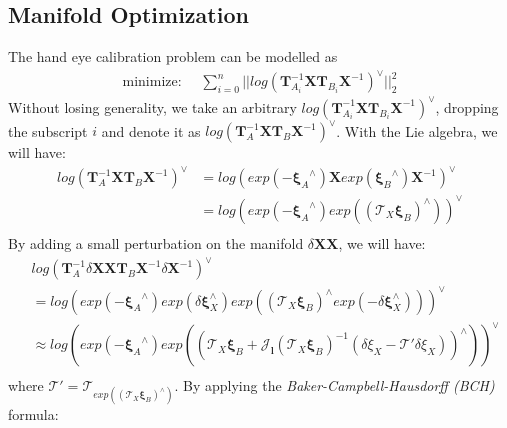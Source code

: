 \subsection{Manifold Optimization}
The hand eye calibration problem can be modelled as
\begin{align}
\text{minimize: }& \ \sum_{i=0}^{n} ||log\left( \mathbf{T}_{A_i}^{-1}\mathbf{X}\mathbf{T}_{B_i}\mathbf{X}^{-1} \right)^{\vee}||_2^2 
\end{align}
Without losing generality, we take an arbitrary $log\left( \mathbf{T}_{A_i}^{-1}\mathbf{X}\mathbf{T}_{B_i}\mathbf{X}^{-1} \right)^{\vee}$, dropping the subscript $i$ and denote it as $log\left( \mathbf{T}_{A}^{-1}\mathbf{X}\mathbf{T}_{B}\mathbf{X}^{-1} \right)^{\vee}$. With the Lie algebra, we will have:
\begin{align}
log\left( \mathbf{T}_{A}^{-1}\mathbf{X}\mathbf{T}_{B}\mathbf{X}^{-1} \right)^{\vee}&=
log\left( exp(-{\mathbf{\xi}_A}^{\wedge})\mathbf{X}exp({\mathbf{\xi}_B}^{\wedge})\mathbf{X}^{-1} \right)^{\vee} \\
&= log\left( exp\left(-{\mathbf{\xi}_A}^{\wedge}\right) exp\left(\left(\mathbf{\mathcal{T}}_X{\mathbf{\xi}_B}\right)^{\wedge}\right) \right)^{\vee} \\
\end{align}
By adding a small perturbation on the manifold $\delta \mathbf{X}\mathbf{X}$, we will have:
\begin{align}
&log \left( \mathbf{T}_{A}^{-1}{\delta\mathbf{X}}\mathbf{X}\mathbf{T}_{B}\mathbf{X}^{-1}{\delta\mathbf{X}^{-1}} \right)^{\vee} \\
&= log\left( exp\left(-{\mathbf{\xi}_A}^{\wedge}\right) {exp(\delta \mathbf{\xi}_{X}^{\wedge})} exp\left(\left(\mathcal{T}_X{\mathbf{\xi}_B}\right)^{\wedge} {exp(-\delta \mathbf{\xi}_{X}^{\wedge})}\right) \right)^{\vee}\\
&\approx log\left( exp\left(-{\mathbf{\xi}_A}^{\wedge}\right) exp
\left(
\left( 
\mathcal{T}_X{\mathbf{\xi}_B} + \mathbf{\mathcal{J}_{l}}
\left(
\mathcal{T}_X{\mathbf{\xi}_B}
\right) ^{-1} 
\left( 
\delta \xi_{X} - \mathbf{\mathcal{T}}' \delta \xi_{X}
\right)
\right)^{\wedge}
\right)
\right)^{\vee} \\
\end{align}
where $\mathbf{\mathcal{T}}' = \mathbf{\mathcal{T}}_{exp\left(\left(\mathcal{T}_X{\mathbf{\xi}_B}\right)^{\wedge}\right)}$. By applying the \textit{Baker-Campbell-Hausdorff (BCH)} formula:
